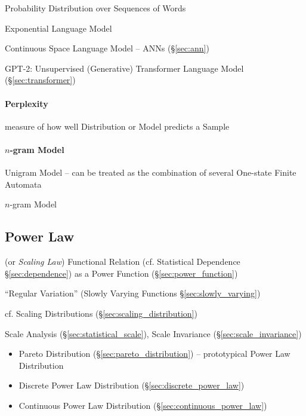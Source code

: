 Probability Distribution over Sequences of Words

Exponential Language Model

Continuous Space Language Model -- ANNs (\S\ref{sec:ann})

GPT-2: Unsupervised (Generative) Transformer Language Model
(\S\ref{sec:transformer})



\paragraph{Perplexity}\label{sec:perplexity}\hfill

measure of how well Distribution or Model predicts a Sample




\paragraph{$n$-gram Model}\label{sec:ngram_model}\hfill

Unigram Model -- can be treated as the combination of several One-state Finite
Automata

$n$-gram Model



\subsection{Power Law}\label{sec:power_law}

(or \emph{Scaling Law}) Functional Relation (cf.
Statistical Dependence \S\ref{sec:dependence}) as a Power Function
(\S\ref{sec:power_function})

``Regular Variation'' (Slowly Varying Functions \S\ref{sec:slowly_varying})

cf. Scaling Distributions (\S\ref{sec:scaling_distribution})


Scale Analysis (\S\ref{sec:statistical_scale}), Scale Invariance
(\S\ref{sec:scale_invariance})

\begin{itemize}
  \item Pareto Distribution (\S\ref{sec:pareto_distribution}) -- prototypical
    Power Law Distribution
  \item Discrete Power Law Distribution (\S\ref{sec:discrete_power_law})
  \item Continuous Power Law Distribution (\S\ref{sec:continuous_power_law})
\end{itemize}

